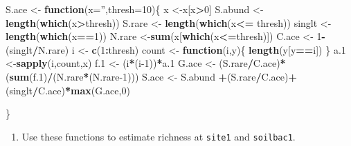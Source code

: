 \documentclass[
]{article}
\newenvironment{Shaded}{\begin{snugshade}}{\end{snugshade}}
\newcommand{\ControlFlowTok}[1]{\textcolor[rgb]{0.13,0.29,0.53}{\textbf{#1}}}
\newcommand{\DataTypeTok}[1]{\textcolor[rgb]{0.13,0.29,0.53}{#1}}
\newcommand{\DecValTok}[1]{\textcolor[rgb]{0.00,0.00,0.81}{#1}}
\newcommand{\FloatTok}[1]{\textcolor[rgb]{0.00,0.00,0.81}{#1}}
\newcommand{\KeywordTok}[1]{\textcolor[rgb]{0.13,0.29,0.53}{\textbf{#1}}}
\newcommand{\NormalTok}[1]{#1}
\newcommand{\OperatorTok}[1]{\textcolor[rgb]{0.81,0.36,0.00}{\textbf{#1}}}
\newcommand{\StringTok}[1]{\textcolor[rgb]{0.31,0.60,0.02}{#1}}
\providecommand{\tightlist}{%
  \setlength{\itemsep}{0pt}\setlength{\parskip}{0pt}}
\begin{document}
\begin{Shaded}
\begin{Highlighting}[]
\NormalTok{S.ace <-}\StringTok{ }\ControlFlowTok{function}\NormalTok{(}\DataTypeTok{x=}\StringTok{''}\NormalTok{,}\DataTypeTok{thresh=}\DecValTok{10}\NormalTok{)\{}
\NormalTok{  x <-x[x}\OperatorTok{>}\DecValTok{0}\NormalTok{]}
\NormalTok{  S.abund <-}\StringTok{ }\KeywordTok{length}\NormalTok{(}\KeywordTok{which}\NormalTok{(x}\OperatorTok{>}\NormalTok{thresh))}
\NormalTok{  S.rare <-}\StringTok{ }\KeywordTok{length}\NormalTok{(}\KeywordTok{which}\NormalTok{(x}\OperatorTok{<=}\StringTok{ }\NormalTok{thresh))}
\NormalTok{  singlt <-}\KeywordTok{length}\NormalTok{(}\KeywordTok{which}\NormalTok{(x}\OperatorTok{==}\DecValTok{1}\NormalTok{))}
\NormalTok{  N.rare <-}\KeywordTok{sum}\NormalTok{(x[}\KeywordTok{which}\NormalTok{(x}\OperatorTok{<=}\NormalTok{thresh)])}
\NormalTok{  C.ace <-}\StringTok{ }\DecValTok{1}\OperatorTok{-}\StringTok{ }\NormalTok{(singlt}\OperatorTok{/}\NormalTok{N.rare)}
\NormalTok{  i <-}\StringTok{ }\KeywordTok{c}\NormalTok{(}\DecValTok{1}\OperatorTok{:}\NormalTok{thresh)}
\NormalTok{  count <-}\StringTok{ }\ControlFlowTok{function}\NormalTok{(i,y)\{}
    \KeywordTok{length}\NormalTok{(y[y}\OperatorTok{==}\NormalTok{i])}
\NormalTok{  \}}
\NormalTok{  a}\FloatTok{.1}\NormalTok{ <-}\KeywordTok{sapply}\NormalTok{(i,count,x)}
\NormalTok{  f}\FloatTok{.1}\NormalTok{ <-}\StringTok{ }\NormalTok{(i}\OperatorTok{*}\NormalTok{(i}\DecValTok{-1}\NormalTok{))}\OperatorTok{*}\NormalTok{a}\FloatTok{.1}
\NormalTok{  G.ace <-}\StringTok{ }\NormalTok{(S.rare}\OperatorTok{/}\NormalTok{C.ace)}\OperatorTok{*}\NormalTok{(}\KeywordTok{sum}\NormalTok{(f}\FloatTok{.1}\NormalTok{)}\OperatorTok{/}\NormalTok{(N.rare}\OperatorTok{*}\NormalTok{(N.rare}\DecValTok{-1}\NormalTok{)))}
\NormalTok{  S.ace <-}\StringTok{ }\NormalTok{S.abund }\OperatorTok{+}\NormalTok{(S.rare}\OperatorTok{/}\NormalTok{C.ace)}\OperatorTok{+}\NormalTok{(singlt}\OperatorTok{/}\NormalTok{C.ace)}\OperatorTok{*}\KeywordTok{max}\NormalTok{(G.ace,}\DecValTok{0}\NormalTok{)}
  
\NormalTok{\}}
\end{Highlighting}
\end{Shaded}

\begin{enumerate}
\def\labelenumi{\arabic{enumi}.}
\setcounter{enumi}{3}
\tightlist
\item
  Use these functions to estimate richness at \texttt{site1} and
  \texttt{soilbac1}.
\end{enumerate}
\end{document}
